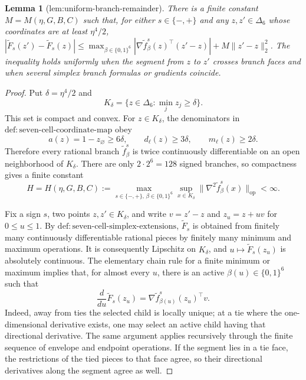 \documentclass{article}
\newtheorem{lemma}{Lemma}
\begin{document}
\begin{lemma}[lem:uniform-branch-remainder]\label{lem:uniform-branch-remainder}
There is a finite constant \(M=M(\eta,G,B,C)\) such that, for either \(s\in\{-,+\}\) and any \(z,z'\in\Delta_6\) whose coordinates are at least \(\eta^4/2\), \(|\widetilde F_s(z')-\widetilde F_s(z)|\leq\max_{\beta\in\{0,1\}^6}|\nabla\widetilde f_\beta^s(z)^\top(z'-z)|+M\|z'-z\|_2^2\). The inequality holds uniformly when the segment from \(z\) to \(z'\) crosses branch faces and when several simplex branch formulas or gradients coincide.
\end{lemma}
\begin{proof}
Put \(\delta=\eta^4/2\) and
\[
 K_\delta=\{z\in\Delta_6:\min_j z_j\geq\delta\}.
\]
This set is compact and convex.  For \(z\in K_\delta\), the denominators in \(\mathrm{def{:}seven\text{-}cell\text{-}coordinate\text{-}map}\) obey
\[
 a(z)=1-z_\varnothing\geq6\delta,
 \qquad
 d_\ell(z)\geq3\delta,
 \qquad
 m_\ell(z)\geq2\delta.
\]
Therefore every rational branch \(\widetilde f_\beta^s\) is twice continuously differentiable on an open neighborhood of \(K_\delta\).  There are only \(2\cdot2^6=128\) signed branches, so compactness gives a finite constant
\[
 H=H(\eta,G,B,C)
 :=\max_{s\in\{-,+\},\,\beta\in\{0,1\}^6}
 \sup_{x\in K_\delta}
 \bigl\|\nabla^2\widetilde f_\beta^s(x)\bigr\|_{\mathrm{op}}<\infty.
\]

Fix a sign \(s\), two points \(z,z'\in K_\delta\), and write \(v=z'-z\) and \(z_u=z+uv\) for \(0\leq u\leq1\).  By \(\mathrm{def{:}seven\text{-}cell\text{-}simplex\text{-}extensions}\), \(\widetilde F_s\) is obtained from finitely many continuously differentiable rational pieces by finitely many minimum and maximum operations.  It is consequently Lipschitz on \(K_\delta\), and \(u\mapsto\widetilde F_s(z_u)\) is absolutely continuous.  The elementary chain rule for a finite minimum or maximum implies that, for almost every \(u\), there is an active \(\beta(u)\in\{0,1\}^6\) such that
\[
 \frac{d}{du}\widetilde F_s(z_u)
 =\nabla\widetilde f_{\beta(u)}^s(z_u)^\top v.
\]
Indeed, away from ties the selected child is locally unique; at a tie where the one-dimensional derivative exists, one may select an active child having that directional derivative.  The same argument applies recursively through the finite sequence of envelope and endpoint operations.  If the segment lies in a tie face, the restrictions of the tied pieces to that face agree, so their directional derivatives along the segment agree as well.


\end{proof}
\end{document}
